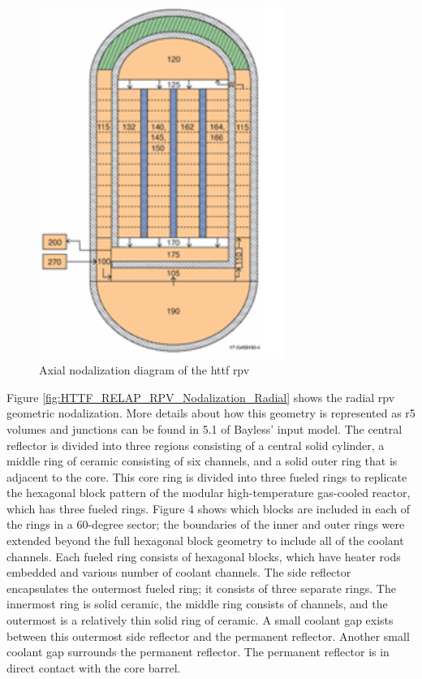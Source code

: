 \documentclass[double,12pt]{beavtex}
\begin{document}
\begin{figure}
    \begin{center}
    	\includegraphics[width=8cm]{Figures/HTTF_RELAP_RPV_Nodalization_Axial.png}
    	\caption{Axial nodalization diagram of the \acrshort{httf} \acrshort{rpv}}
    	\label{fig:HTTF_RELAP_RPV_Nodalization_Axial}
    	\end{center}
\end{figure}

Figure \ref{fig:HTTF_RELAP_RPV_Nodalization_Radial} shows the radial \acrshort{rpv} geometric nodalization. More details about how this geometry is represented as \acrshort{r5} volumes and junctions can be found in 5.1 of Bayless’ input model. The central reflector is divided into three regions consisting of a central solid cylinder, a middle ring of ceramic consisting of six channels, and a solid outer ring that is adjacent to the core. This core ring is divided into three fueled rings to replicate the hexagonal block pattern of the modular high-temperature gas-cooled reactor, which has three fueled rings. Figure 4 shows which blocks are included in each of the rings in a 60-degree sector; the boundaries of the inner and outer rings were extended beyond the full hexagonal block geometry to include all of the coolant channels. Each fueled ring consists of hexagonal blocks, which have heater rods embedded and various number of coolant channels. The side reflector encapsulates the outermost fueled ring; it consists of three separate rings. The innermost ring is solid ceramic, the middle ring consists of channels, and the outermost is a relatively thin solid ring of ceramic. A small coolant gap exists between this outermost side reflector and the permanent reflector. Another small coolant gap surrounds the permanent reflector. The permanent reflector is in direct contact with the core barrel.
\end{document}
